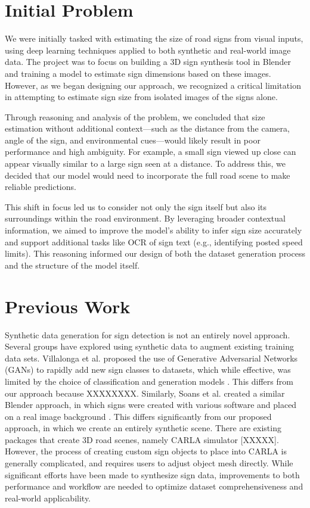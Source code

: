 \documentclass[journal]{IEEEtran}
\begin{document}
\section{Initial Problem}
We were initially tasked with estimating the size of road signs from visual inputs, using deep learning techniques applied to both synthetic and real-world image data. The project was to focus on building a 3D sign synthesis tool in Blender and training a model to estimate sign dimensions based on these images. However, as we began designing our approach, we recognized a critical limitation in attempting to estimate sign size from isolated images of the signs alone.

Through reasoning and analysis of the problem, we concluded that size estimation without additional context—such as the distance from the camera, angle of the sign, and environmental cues—would likely result in poor performance and high ambiguity. For example, a small sign viewed up close can appear visually similar to a large sign seen at a distance. To address this, we decided that our model would need to incorporate the full road scene to make reliable predictions.

This shift in focus led us to consider not only the sign itself but also its surroundings within the road environment. By leveraging broader contextual information, we aimed to improve the model’s ability to infer sign size accurately and support additional tasks like OCR of sign text (e.g., identifying posted speed limits). This reasoning informed our design of both the dataset generation process and the structure of the model itself.


\section{Previous Work}

 Synthetic data generation for sign detection is not an entirely novel approach. Several groups have explored using synthetic data to augment existing training data sets. Villalonga et al. proposed the use of Generative Adversarial Networks (GANs) to rapidly add new sign classes to datasets, which while effective, was limited by the choice of classification and generation models \cite{GAN_artificial_data}. This differs from our approach because XXXXXXXX. Similarly, Soans et al. created a similar Blender approach, in which signs were created with various software and placed on a real image background \cite{blender_paper}. This differs significantly from our proposed approach, in which we create an entirely synthetic scene. There are existing packages that create 3D road scenes, namely CARLA simulator [XXXXX]. However, the process of creating custom sign objects to place into CARLA is generally complicated, and requires users to adjust object mesh directly. While significant efforts have been made to synthesize sign data, improvements to both performance and workflow are needed to optimize dataset comprehensiveness and real-world applicability. 
\end{document}
